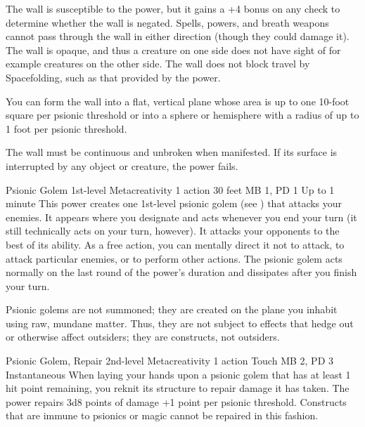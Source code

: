The wall is susceptible to the  power,
but it gains a +4 bonus on any check
to determine whether the wall is negated.
Spells, powers, and breath weapons cannot pass through the wall
in either direction
(though they could damage it).
The wall is opaque, and thus a creature on one side does not have
sight of for example creatures on the other side.
The wall does not block travel by Spacefolding,
such as that provided by the  power.
  
You can form the wall into a flat, vertical plane
whose area is up to one 10-foot square per psionic threshold
or into a sphere or hemisphere
with a radius of up to 1 foot per psionic threshold.
  
The wall must be continuous and unbroken when manifested.
If its surface is interrupted by any object or creature,
the power fails.

\DndPowerHeader%
  {Psionic Golem}
  {1st-level Metacreativity}
  {1 action}
  {30 feet}
  {MB 1, PD 1}
  {Up to 1 minute}
  This power creates one 1st-level psionic golem
  (see )
  that attacks your enemies.
  It appears where you designate and acts
  whenever you end your turn
  (it still technically acts on your turn, however).
  It attacks your opponents to the best of its ability.
  As a free action,
  you can mentally direct it not to attack,
  to attack particular enemies,
  or to perform other actions.
  The psionic golem acts normally on the last round
  of the power's duration
  and dissipates after you finish your turn.

  Psionic golems are not summoned;
  they are created on the plane you inhabit
  using raw, mundane matter.
  Thus, they are not subject to effects
  that hedge out or otherwise affect outsiders;
  they are constructs, not outsiders.

\DndPowerHeader%
  {Psionic Golem, Repair}
  {2nd-level Metacreativity}
  {1 action}
  {Touch}
  {MB 2, PD 3}
  {Instantaneous}
  When laying your hands upon a psionic golem
  that has at least 1 hit point remaining,
  you reknit its structure to repair damage it has taken.
  The power repairs 3d8 points of damage
  +1 point per psionic threshold.
  Constructs that are immune to psionics or magic
  cannot be repaired in this fashion.

